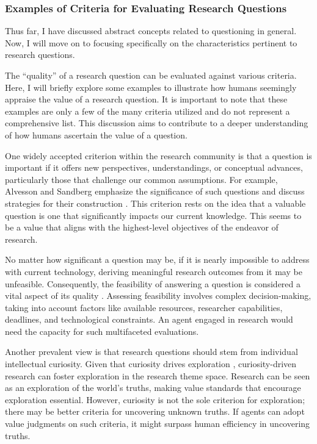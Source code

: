 \subsubsection{Examples of Criteria for Evaluating Research Questions}

Thus far, I have discussed abstract concepts related to questioning in general. Now, I will move on to focusing specifically on the characteristics pertinent to research questions.

The ``quality'' of a research question can be evaluated against various criteria. Here, I will briefly explore some examples to illustrate how humans seemingly appraise the value of a research question. It is important to note that these examples are only a few of the many criteria utilized and do not represent a comprehensive list. This discussion aims to contribute to a deeper understanding of how humans ascertain the value of a question.

One widely accepted criterion within the research community is that a question is important if it offers new perspectives, understandings, or conceptual advances, particularly those that challenge our common assumptions. For example, Alvesson and Sandberg emphasize the significance of such questions and discuss strategies for their construction \cite{alvesson2013constructing}. This criterion rests on the idea that a valuable question is one that significantly impacts our current knowledge. This seems to be a value that aligns with the highest-level objectives of the endeavor of research.

No matter how significant a question may be, if it is nearly impossible to address with current technology, deriving meaningful research outcomes from it may be unfeasible. Consequently, the feasibility of answering a question is considered a vital aspect of its quality \cite{hulley2007designing,alon2009choose,huntington2021effect}. Assessing feasibility involves complex decision-making, taking into account factors like available resources, researcher capabilities, deadlines, and technological constraints. An agent engaged in research would need the capacity for such multifaceted evaluations.

Another prevalent view is that research questions should stem from individual intellectual curiosity. Given that curiosity drives exploration \cite{oudeyer2018computational}, curiosity-driven research can foster exploration in the research theme space. Research can be seen as an exploration of the world's truths, making value standards that encourage exploration essential. However, curiosity is not the sole criterion for exploration; there may be better criteria for uncovering unknown truths. If agents can adopt value judgments on such criteria, it might surpass human efficiency in uncovering truths.

